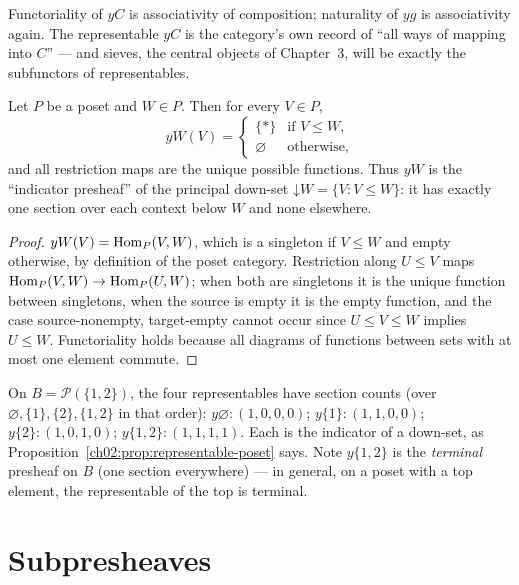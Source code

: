 Functoriality of $yC$ is associativity of composition; naturality of
$yg$ is associativity again. The representable $yC$ is the category's
own record of ``all ways of mapping into $C$'' --- and sieves, the
central objects of Chapter~3, will be exactly the subfunctors of
representables.

\begin{proposition}\label{ch02:prop:representable-poset}
Let $P$ be a poset and $W \in P$. Then for every $V \in P$,
\[
yW(V) =
\begin{cases}
\{\ast\} & \text{if } V \le W,\\
\varnothing & \text{otherwise,}
\end{cases}
\]
and all restriction maps are the unique possible functions. Thus $yW$ is
the ``indicator presheaf'' of the principal down-set
$\mathord{\downarrow} W = \{V : V \le W\}$: it has exactly one section
over each context below $W$ and none elsewhere.
\end{proposition}

\begin{proof}
$yW(V) = \mathrm{Hom}_P(V, W)$, which is a singleton if $V \le W$ and empty
otherwise, by definition of the poset category. Restriction along
$U \le V$ maps $\mathrm{Hom}_P(V, W) \to \mathrm{Hom}_P(U, W)$; when both are singletons
it is the unique function between singletons, when the source is empty
it is the empty function, and the case source-nonempty,
target-empty cannot occur since $U \le V \le W$ implies $U \le W$.
Functoriality holds because all diagrams of functions between sets with
at most one element commute.
\end{proof}

\begin{example}\label{ch02:ex:representables-square}
On $B = \mathcal{P}(\{1,2\})$, the four representables have section
counts (over $\varnothing, \{1\}, \{2\}, \{1,2\}$ in that order):
$y\varnothing : (1, 0, 0, 0)$; $y\{1\} : (1, 1, 0, 0)$;
$y\{2\} : (1, 0, 1, 0)$; $y\{1,2\} : (1, 1, 1, 1)$. Each is the
indicator of a down-set, as
Proposition~\ref{ch02:prop:representable-poset} says. Note $y\{1,2\}$ is
the \emph{terminal} presheaf on $B$ (one section everywhere) --- in
general, on a poset with a top element, the representable of the top is
terminal.
\end{example}

\section{Subpresheaves}\label{ch02:sec:subpresheaves}

